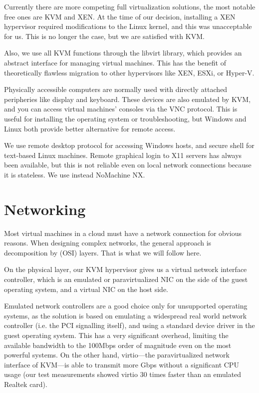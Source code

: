 \documentclass{llncs}
\begin{document}
Currently there are more competing full virtualization solutions, the most notable free ones are KVM and XEN. At the time of our decision, installing a XEN hypervisor required modifications to the Linux kernel, and this was unacceptable for us. This is no longer the case, but we are satisfied with KVM.

Also, we use all KVM functions through the libvirt library, which provides an abstract interface for managing virtual machines. This has the benefit of theoretically flawless migration to other hypervisors like XEN, ESXi, or Hyper-V.

Physically accessible computers are normally used with directly attached peripheries like display and keyboard. These devices are also emulated by KVM, and you can access virtual machines' consoles via the VNC protocol. This is useful for installing the operating system or troubleshooting, but Windows and Linux both provide better alternative for remote access.

We use remote desktop protocol for accessing Windows hosts, and secure shell for text-based Linux machines. Remote graphical login to X11 servers has always been available, but this is not reliable even on local network connections because it is stateless. We use instead NoMachine NX.


\section{Networking}

Most virtual machines in a cloud must have a network connection for obvious reasons.  When designing complex networks, the general approach is decomposition by (OSI) layers. That is what we will follow here.

On the physical layer, our KVM hypervisor gives us a virtual network interface controller, which is an emulated or paravirtualized NIC on the side of the guest operating system, and a virtual NIC on the host side.

Emulated network controllers are a good choice only for unsupported operating systems, as the solution is based on emulating a widespread real world network controller (i.e. the PCI signalling itself), and using a standard device driver in the guest operating system. This has a very significant overhead, limiting the available bandwidth to the 100Mbps order of magnitude even on the most powerful systems. On the other hand, virtio---the paravirtualized network interface of KVM---is able to transmit more Gbps without a significant CPU usage (our test measurements showed virtio 30 times faster than an emulated Realtek card).
\end{document}
